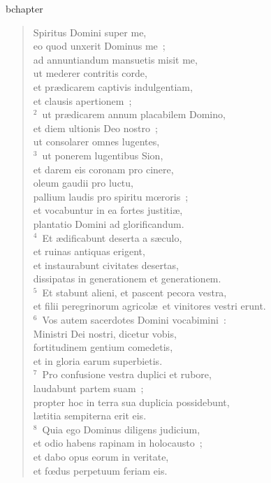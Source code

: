bchapter\begin{verse}\vspace{-19pt}Spiritus Domini super me,\\ eo quod unxerit Dominus me~;\\ ad annuntiandum mansuetis misit me,\\ ut mederer contritis corde,\\ et pr\ae dicarem captivis indulgentiam,\\ et clausis apertionem~;\\
${}^{2}$~ut pr\ae dicarem annum placabilem Domino,\\ et diem ultionis Deo nostro~;\\ ut consolarer omnes lugentes,\\
${}^{3}$~ut ponerem lugentibus Sion,\\ et darem eis coronam pro cinere,\\ oleum gaudii pro luctu,\\ pallium laudis pro spiritu mœroris~;\\ et vocabuntur in ea fortes justiti\ae ,\\ plantatio Domini ad glorificandum.\\
${}^{4}$~Et \ae dificabunt deserta a s\ae culo,\\ et ruinas antiquas erigent,\\ et instaurabunt civitates desertas,\\ dissipatas in generationem et generationem.\\
${}^{5}$~Et stabunt alieni, et pascent pecora vestra,\\ et filii peregrinorum agricol\ae\ et vinitores vestri erunt.\\
${}^{6}$~Vos autem sacerdotes Domini vocabimini~:\\ Ministri Dei nostri, dicetur vobis,\\ fortitudinem gentium comedetis,\\ et in gloria earum superbietis.\\
${}^{7}$~Pro confusione vestra duplici et rubore,\\ laudabunt partem suam~;\\ propter hoc in terra sua duplicia possidebunt,\\ l\ae titia sempiterna erit eis.\\
${}^{8}$~Quia ego Dominus diligens judicium,\\ et odio habens rapinam in holocausto~;\\ et dabo opus eorum in veritate,\\ et fœdus perpetuum feriam eis.\\

\end{verse}
